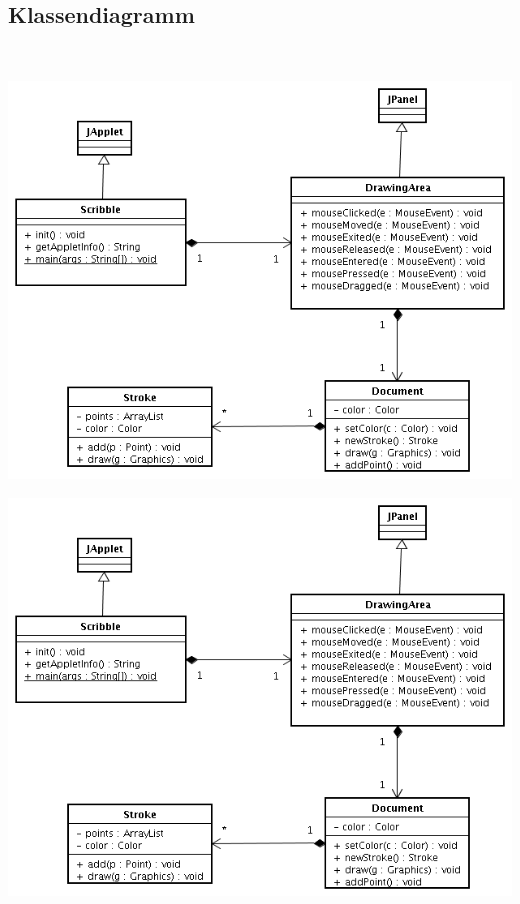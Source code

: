 \subsection{Klassendiagramm}\ \\
%
\ifslides
\begin{center}
\includegraphics[width=0.65\linewidth]{examples/Scribble/doc/scribble-classdiagram}
\end{center}
\else
\includegraphics[width=0.9\linewidth]{examples/Scribble/doc/scribble-classdiagram}
\fi
